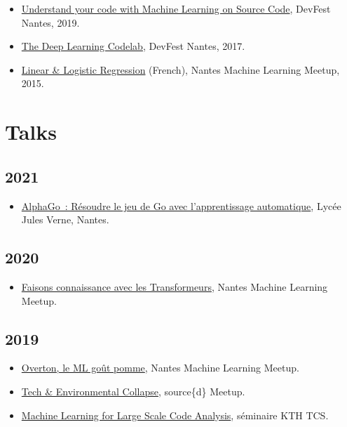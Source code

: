 \documentclass[11pt,a4paper]{moderncv}
\begin{document}
\begin{itemize}
\item \href{https://github.com/m09/deeplearning-codelab}{Understand
    your code with Machine Learning on Source Code}, DevFest Nantes,
  2019.
\item \href{https://github.com/m09/deeplearning-codelab}{The Deep
    Learning Codelab}, DevFest Nantes, 2017.
\item
  \href{https://github.com/nantes-machine-learning-meetup/NMLM/tree/master/2015-10-05__r\%C3\%A9gression-lin\%C3\%A9aire-logistique}{
    Linear \& Logistic Regression} (French), Nantes Machine
  Learning Meetup, 2015.
\end{itemize}

\section{Talks}
\subsection{2021}

\begin{itemize}
\item
  \href{https://github.com/m09/decks/blob/main/2016-03-alphago/jules-verne.html}{AlphaGo~: Résoudre le jeu de Go avec l'apprentissage automatique}, Lycée Jules Verne, Nantes.
\end{itemize}

\subsection{2020}
\begin{itemize}
  \item
  \href{https://www.meetup.com/Nantes-Machine-Learning-Meetup/events/268243136/}{Faisons connaissance avec les Transformeurs}, Nantes Machine Learning Meetup.
\end{itemize}

\subsection{2019}

\begin{itemize}
\item
  \href{https://www.meetup.com/Nantes-Machine-Learning-Meetup/events/265265431/}{Overton, le ML goût pomme}, Nantes Machine Learning Meetup.
\item
  \href{https://www.eventbrite.com/e/tech-environmental-collapse-tickets-57986002695}{Tech
    \& Environmental Collapse}, source\{d\} Meetup.
\item \href{https://github.com/m09/talks/tree/master/kth}{Machine
    Learning for Large Scale Code Analysis}, séminaire KTH TCS.
\end{itemize}
\end{document}
